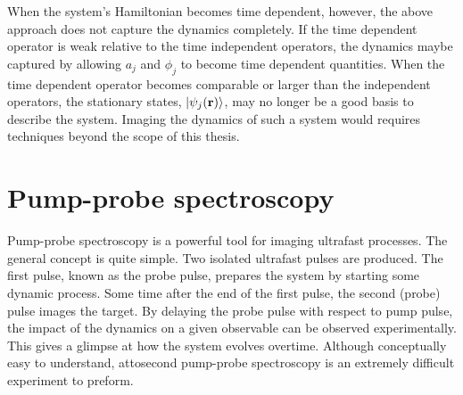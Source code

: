When the system's Hamiltonian becomes time dependent, however, the above approach does not capture the dynamics completely. If the time dependent operator is weak relative to the time independent operators, the dynamics maybe captured by allowing $a_j$ and $\phi_j$ to become time dependent quantities. When the time dependent operator becomes comparable or larger than the independent operators, the stationary states, $\ket{\psi_j(\mathbf{r})}$, may no longer be a good basis to describe the system. Imaging the dynamics of such a system would requires techniques beyond the scope of this thesis.

\section{Pump-probe spectroscopy} %
\label{sec:pump_probe_spectroscopy}
Pump-probe spectroscopy is a powerful tool for imaging ultrafast processes. The general concept is quite simple. Two isolated ultrafast pulses are produced. The first pulse, known as the probe pulse, prepares the system by starting some dynamic process. Some time after the end of the first pulse, the second (probe) pulse images the target. By delaying the probe pulse with respect to pump pulse, the impact of the dynamics on a given observable can be observed experimentally. This gives a glimpse at how the system evolves overtime. Although conceptually easy to understand, attosecond pump-probe spectroscopy is an extremely difficult experiment to preform. 

